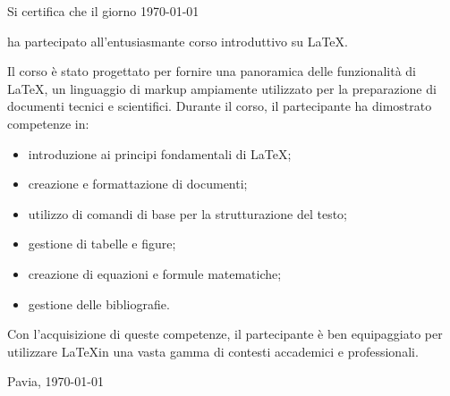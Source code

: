 \documentclass[a4paper, 12pt]{article} %
\begin{document}
\vspace{2cm}


\noindent Si certifica che il giorno \today

\begin{center}

\Large

{\bf
  
}


\end{center}

\normalsize

\noindent ha partecipato all'entusiasmante corso introduttivo su \LaTeX.

Il corso è stato progettato per fornire una panoramica delle funzionalità di \LaTeX, un linguaggio di markup ampiamente utilizzato per la preparazione di documenti tecnici e scientifici. Durante il corso, il partecipante ha dimostrato competenze in:

\begin{itemize}[label={-}]
\item introduzione ai principi fondamentali di \LaTeX;
\item creazione e formattazione di documenti;
\item utilizzo di comandi di base per la strutturazione del testo;
\item gestione di tabelle e figure;
\item creazione di equazioni e formule matematiche;
\item gestione delle bibliografie.
\end{itemize}



Con l'acquisizione di queste competenze, il partecipante è ben equipaggiato per utilizzare \LaTeX in una vasta gamma di contesti accademici e professionali.

\vspace{1cm}

\flushright

Pavia, \today
\end{document}
